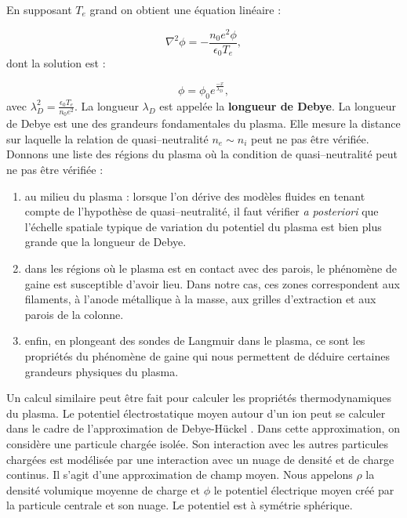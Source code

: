 \documentclass{book}
\begin{document}
En supposant $T_e$ grand on obtient une \'equation lin\'eaire :

\begin{equation}
\nabla^2 \phi=-\frac{n_0e^2\phi}{\epsilon_0T_e},
\end{equation}
dont la solution est :

\begin{equation}
\phi=\phi_0e^{\frac{-x}{\lambda_D}},
\end{equation}
avec $\lambda_D^2=\frac{\epsilon_0T_e}{n_0e^2}$. La longueur $\lambda_D$
est appel\'ee la {\bf longueur de Debye}.
La longueur de Debye est une des grandeurs fondamentales du plasma.
Elle mesure la distance sur laquelle la relation de quasi--neutralit\'e
$n_e\sim n_i$ peut ne pas \^etre v\'erifi\'ee. Donnons une liste  des
r\'egions du plasma
o\`u la condition de quasi--neutralit\'e peut ne 
pas \^etre v\'erifi\'ee :

\begin{enumerate}
\item au milieu du plasma : lorsque l'on d\'erive des mod\`eles fluides
en tenant 
compte de l'hypoth\`ese de quasi--neutralit\'e, il faut v\'erifier
{\it a
posteriori} que l'\'echelle spatiale typique  de variation du potentiel
du plasma est 
bien plus grande que la longueur de Debye.
\item dans les r\'egions o\`u  le plasma est en contact avec des parois,
le ph\'enom\`ene  de gaine est susceptible d'avoir lieu. Dans notre cas,
ces zones  correspondent aux filaments, \`a l'anode m\'etallique \`a la
masse, aux grilles d'extraction et aux parois de la colonne.
\item enfin, en plongeant des sondes de Langmuir dans le plasma, ce
sont 
les propri\'et\'es du  ph\'enom\`ene de gaine qui nous permettent de
d\'eduire certaines 
grandeurs  physiques du plasma.
\end{enumerate}

Un calcul similaire peut \^etre fait pour calculer les propri\'et\'es
thermodynamiques du plasma. Le potentiel \'electrostatique moyen autour
d'un ion peut se calculer dans le cadre de l'approximation de
Debye-H\"uckel \cite{Diu89}. Dans cette approximation, on consid\`ere une
particule charg\'ee isol\'ee. Son interaction avec les autres
particules charg\'ees est mod\'elis\'ee par une interaction avec un 
nuage de densit\'e et de charge continus. Il s'agit d'une approximation
de champ moyen.
Nous appelons $\rho$ la densit\'e
volumique moyenne de charge et $\phi$ le potentiel \'electrique moyen
cr\'e\'e par la particule centrale et son nuage. Le potentiel est \`a
sym\'etrie sph\'erique.
\end{document}
